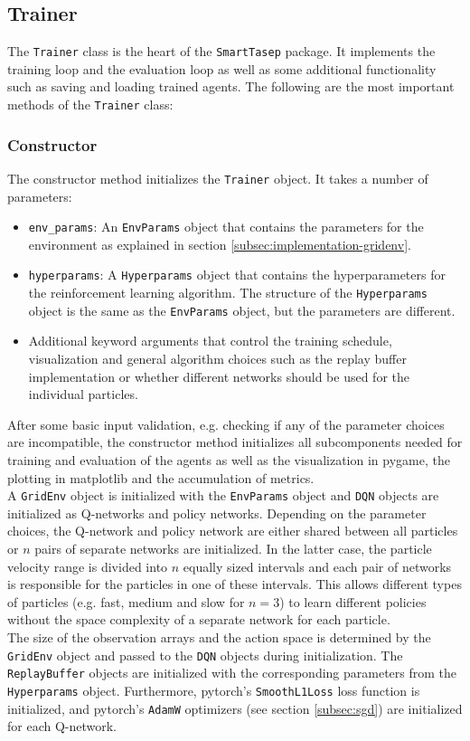 \subsection{Trainer}
\label{subsec:implementation-trainer}
The \texttt{Trainer} class is the heart of the \texttt{SmartTasep} package. It implements the training loop and the evaluation loop as well as some additional functionality such as saving and loading trained agents. The following are the most important methods of the \texttt{Trainer} class:

\subsubsection{Constructor}
The constructor method initializes the \texttt{Trainer} object. It takes a number of parameters:
\begin{itemize}
    \item \texttt{env\_params}: An \texttt{EnvParams} object that contains the parameters for the environment as explained in section \ref{subsec:implementation-gridenv}.
    \item \texttt{hyperparams}: A \texttt{Hyperparams} object that contains the hyperparameters for the reinforcement learning algorithm. The structure of the \texttt{Hyperparams} object is the same as the \texttt{EnvParams} object, but the parameters are different.
    \item Additional keyword arguments that control the training schedule, visualization and general algorithm choices such as the replay buffer implementation or whether different networks should be used for the individual particles.
\end{itemize}
After some basic input validation, e.g. checking if any of the parameter choices are incompatible, the constructor method initializes all subcomponents needed for training and evaluation of the agents as well as the visualization in pygame, the plotting in matplotlib and the accumulation of metrics.
\\
A \texttt{GridEnv} object is initialized with the \texttt{EnvParams} object and \texttt{DQN} objects are initialized as Q-networks and policy networks. Depending on the parameter choices, the Q-network and policy network are either shared between all particles or $n$ pairs of separate networks are initialized. In the latter case, the particle velocity range is divided into $n$ equally sized intervals and each pair of networks is responsible for the particles in one of these intervals. This allows different types of particles (e.g. fast, medium and slow for $n=3$) to learn different policies without the space complexity of a separate network for each particle.
\\
The size of the observation arrays and the action space is determined by the \texttt{GridEnv} object and passed to the \texttt{DQN} objects during initialization. The \texttt{ReplayBuffer} objects are initialized with the corresponding parameters from the \texttt{Hyperparams} object. Furthermore, pytorch's \texttt{SmoothL1Loss} loss function is initialized, and pytorch's \texttt{AdamW} optimizers (see section \ref{subsec:sgd}) are initialized for each Q-network. 


